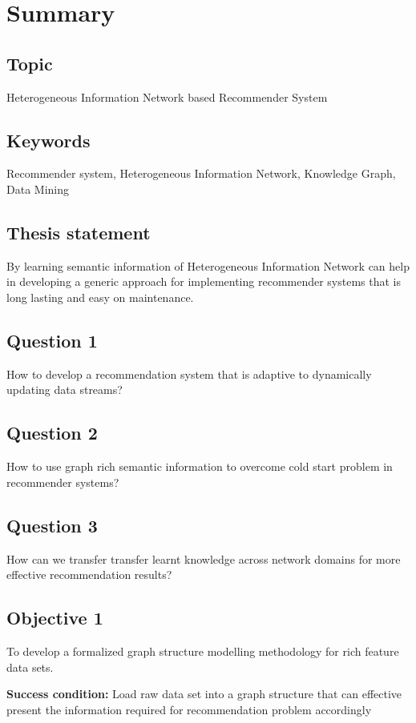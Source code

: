 \section*{Summary}

\subsection*{Topic} Heterogeneous Information Network based Recommender System

\subsection*{Keywords} 

Recommender system, Heterogeneous Information Network, Knowledge Graph, Data Mining 

\subsection*{Thesis statement}
By learning semantic information of Heterogeneous Information Network can help in developing a generic approach for implementing recommender systems that is long lasting and easy on maintenance. 

\subsection*{Question 1}
How to develop a recommendation system that is adaptive to dynamically updating data streams?

\subsection*{Question 2}
How to use graph rich semantic information to overcome cold start problem in recommender systems?

\subsection*{Question 3}
How can we transfer transfer learnt knowledge across network domains for more effective recommendation results?

\subsection*{Objective 1}
To develop a formalized graph structure modelling methodology for rich feature data sets. 

\textbf{Success condition:} Load raw data set into a graph structure that can effective present the information required for recommendation problem accordingly 

